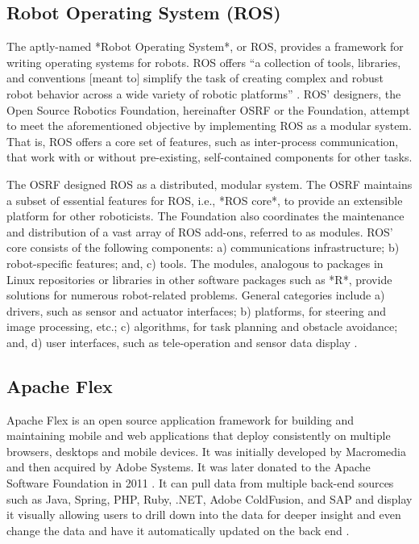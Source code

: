 {\subsection{Robot Operating System (ROS)}

     The aptly-named *Robot Operating System*, or ROS, provides a
     framework for writing operating systems for robots.  ROS offers ``a 
     collection of tools, libraries, and conventions [meant to] simplify the 
     task of creating complex and robust robot behavior across a wide variety 
     of robotic platforms'' \cite{www-ros-about}. ROS' designers, the Open 
     Source Robotics Foundation, hereinafter OSRF or the Foundation, attempt 
     to meet the aforementioned objective by implementing ROS as a modular 
     system.  That is, ROS offers a core set of features, such as 
     inter-process communication, that work with or without pre-existing, 
     self-contained components for other tasks.

     The OSRF designed ROS as a distributed, modular system.  The OSRF 
     maintains a subset of essential features for ROS, i.e., *ROS 
     core*, to provide an extensible platform for other roboticists.  The 
     Foundation also coordinates the maintenance and distribution of a vast 
     array of ROS add-ons, referred to as modules.  ROS' core consists of the 
     following components: a) communications infrastructure; b) robot-specific 
     features; and, c) tools.  The modules, analogous to packages in Linux 
     repositories or libraries in other software packages such as *R*, 
     provide solutions for numerous robot-related problems.  General 
     categories include a) drivers, such as sensor and actuator interfaces; b) 
     platforms, for steering and image processing, etc.; c) algorithms, for 
     task planning and obstacle avoidance; and, d) user interfaces, such as 
     tele-operation and sensor data display \cite{www-software-categories}.


\subsection{Apache Flex \cv}

     Apache Flex \cite{www-flex} is an open source application
     framework for building and maintaining mobile and web
     applications that deploy consistently on multiple browsers,
     desktops and mobile devices. It was initially developed by
     Macromedia and then acquired by Adobe Systems. It was later
     donated to the Apache Software Foundation in 2011
     \cite{blog-flex}. It can pull data from multiple back-end
     sources such as Java, Spring, PHP, Ruby, .NET, Adobe ColdFusion,
     and SAP and display it visually allowing users to drill down into
     the data for deeper insight and even change the data and have it
     automatically updated on the back end \cite{wiki-flex}.

}
